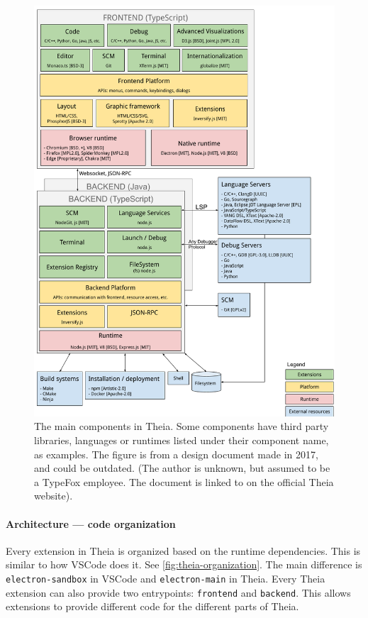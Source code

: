 \begin{figure}[htbp]  %
  \centering
  \includegraphics[width=\textwidth]{figures/Multi-Language-IDE-implemented-in-JS-Scope-and-Architecture}
  \caption[Theia module Architecture]{The main components in Theia. Some components have third party libraries, languages or runtimes listed under their component name, as examples. The figure is from a design document made in 2017, and could be outdated. (The author is unknown, but assumed to be a TypeFox employee. The document is linked to on the official Theia website).~\cite{MultiLanguageIDEImplemented2017}}\label{fig:theia-components}
\end{figure}

\paragraph*{Architecture --- code organization}
Every extension in Theia is organized based on the runtime dependencies.
This is similar to how \gls{VSCode} does it.
See \cref{fig:theia-organization}. The main difference is \texttt{electron-sandbox} in \gls{VSCode} and \texttt{electron-main} in Theia.
Every Theia extension can also provide two entrypoints: \texttt{frontend} and \texttt{backend}. This allows extensions to provide different code for the different parts of Theia. %

